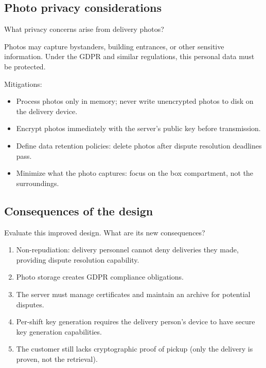 \subsection{Photo privacy considerations}

\begin{exercise}
  What privacy concerns arise from delivery photos?
\end{exercise}

Photos may capture bystanders, building entrances, or other sensitive
information.
Under the \ac{GDPR} and similar regulations, this personal data must be
protected.

Mitigations:
\begin{itemize}
  \item Process photos only in memory; never write unencrypted photos to
    disk on the delivery device.
  \item Encrypt photos immediately with the server's public key before
    transmission.
  \item Define data retention policies: delete photos after dispute
    resolution deadlines pass.
  \item Minimize what the photo captures: focus on the box compartment,
    not the surroundings.
\end{itemize}

\subsection{Consequences of the design}

\begin{exercise}
  Evaluate this improved design.
  What are its new consequences?
\end{exercise}

\begin{enumerate}
  \item Non-repudiation: delivery personnel cannot deny deliveries they
    made, providing dispute resolution capability.
  \item Photo storage creates \ac{GDPR} compliance obligations.
  \item The server must manage certificates and maintain an archive for
    potential disputes.
  \item Per-shift key generation requires the delivery person's device to
    have secure key generation capabilities.
  \item The customer still lacks cryptographic proof of pickup (only the
    delivery is proven, not the retrieval).
\end{enumerate}


